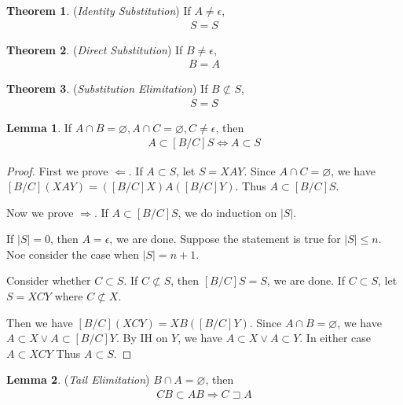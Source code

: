 \documentclass{article}
\theoremstyle{definition}
\newtheorem{theorem}{Theorem}[section]
\newtheorem{lemma}{Lemma}[section]
\begin{document}
\begin{theorem}
    (\emph{Identity Substitution})
    If $A\neq \epsilon$,
    \begin{align}
        [A/A]S = S
    \end{align}
\end{theorem}

\begin{theorem}
    (\emph{Direct Substitution})
    If $B\neq \epsilon$,
    \begin{align}
        [A/B]B = A
    \end{align}
\end{theorem}

\begin{theorem}
    (\emph{Substitution Elimitation})
    If $B\not\subset S$,
    \begin{align}
        [A/B]S = S
    \end{align}
\end{theorem}

\begin{lemma}
    If $A \cap B = \varnothing, A \cap C = \varnothing, C \neq \epsilon$, then
    \begin{align}
        A\subset [B/C]S \Leftrightarrow A \subset S
    \end{align}
    \label{thm:independent substituion}
\end{lemma}

\begin{proof}
    First we prove $\Leftarrow$.
    If $A \subset S$, let $S = XAY$. Since $A \cap C = \varnothing$, we have $[B/C](XAY) = ([B/C]X)A([B/C]Y)$. Thus $A \subset [B/C]S$.

    Now we prove $\Rightarrow$.
    If $A \subset [B/C]S$, we do induction on $|S|$.

    If $|S| = 0$, then $A = \epsilon$, we are done. Suppose the statement is true for $|S|\leq n$. Noe consider the case when $|S| = n+1$.

    Consider whether $C \subset S$. If $C \not\subset S$, then $[B/C]S = S$, we are done. If $C \subset S$, let $S = XCY$ where $C\not\subset X$.

    Then we have $[B/C](XCY) = XB([B/C]Y)$. Since $A \cap B = \varnothing$, we have $A \subset X \lor A \subset [B/C]Y$. By IH on $Y$, we have $A \subset X \lor A \subset Y$. In either case $A\subset XCY$ Thus $A \subset S$.
\end{proof}

\begin{lemma}
    (\emph{Tail Elimitation})
    $B\cap A=\varnothing$, then
    \begin{align}
        CB\subset AB \Rightarrow C \sqsupset A
    \end{align}
\end{lemma}
\end{document}
